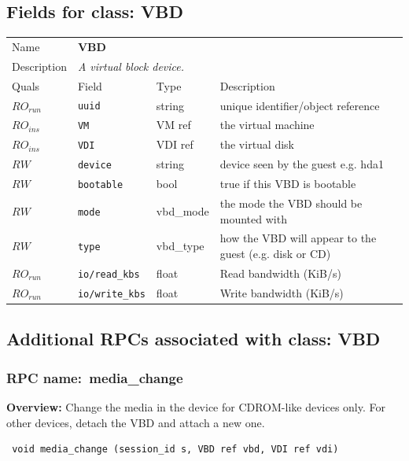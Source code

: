 \subsection{Fields for class: VBD}
\begin{longtable}{|lllp{}|}
\hline
\multicolumn{1}{|l}{Name} & \multicolumn{3}{l|}{\bf VBD} \\
\multicolumn{1}{|l}{Description} & \multicolumn{3}{l|}{\parbox{11cm}{\em A
virtual block device.}} \\
\hline
Quals & Field & Type & Description \\
\hline
$\mathit{RO}_\mathit{run}$ &  {\tt uuid} & string & unique identifier/object reference \\
$\mathit{RO}_\mathit{ins}$ &  {\tt VM} & VM ref & the virtual machine \\
$\mathit{RO}_\mathit{ins}$ &  {\tt VDI} & VDI ref & the virtual disk \\
$\mathit{RW}$ &  {\tt device} & string & device seen by the guest e.g. hda1 \\
$\mathit{RW}$ &  {\tt bootable} & bool & true if this VBD is bootable \\
$\mathit{RW}$ &  {\tt mode} & vbd\_mode & the mode the VBD should be mounted with \\
$\mathit{RW}$ &  {\tt type} & vbd\_type & how the VBD will appear to the guest (e.g. disk or CD) \\
$\mathit{RO}_\mathit{run}$ &  {\tt io/read\_kbs} & float & Read bandwidth (KiB/s) \\
$\mathit{RO}_\mathit{run}$ &  {\tt io/write\_kbs} & float & Write bandwidth (KiB/s) \\
\hline
\end{longtable}
\subsection{Additional RPCs associated with class: VBD}
\subsubsection{RPC name:~media\_change}

{\bf Overview:} 
Change the media in the device for CDROM-like devices only. For other
devices, detach the VBD and attach a new one.

\begin{verbatim} void media_change (session_id s, VBD ref vbd, VDI ref vdi)\end{verbatim}


